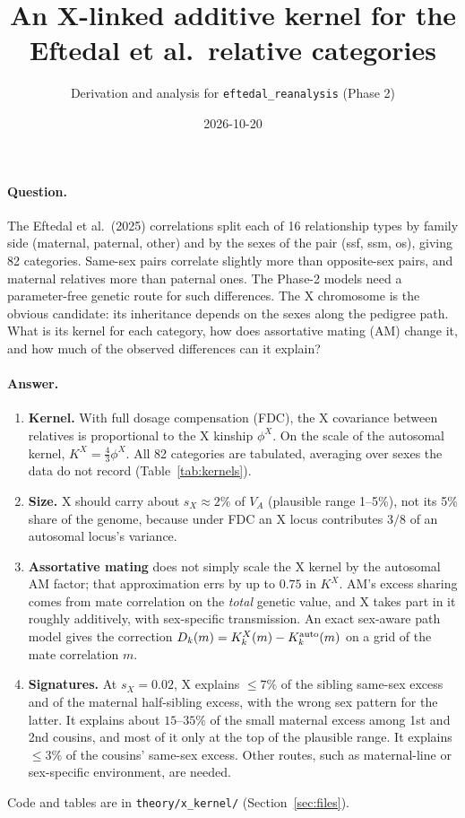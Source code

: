 \documentclass[11pt]{article}
\title{An X-linked additive kernel for the Eftedal et al.\ relative categories}
\author{Derivation and analysis for \texttt{eftedal\_reanalysis} (Phase 2)}
\date{2026-10-20}
\newcommand{\Kx}{K^{X}}
\newcommand{\Ka}{K^{\rm auto}}
\begin{document}
\maketitle

\paragraph{Question.}
The Eftedal et al.\ (2025) correlations split each of 16 relationship types by family side (maternal,
paternal, other) and by the sexes of the pair (ssf, ssm, os), giving 82 categories. Same-sex pairs correlate
slightly more than opposite-sex pairs, and maternal relatives more than paternal ones. The Phase-2 models
need a parameter-free genetic route for such differences. The X chromosome is the obvious candidate: its
inheritance depends on the sexes along the pedigree path. What is its kernel for each category, how does
assortative mating (AM) change it, and how much of the observed differences can it explain?

\paragraph{Answer.}
\begin{enumerate}
  \item \textbf{Kernel.} With full dosage compensation (FDC), the X covariance between relatives is
    proportional to the X kinship $\phi^X$. On the scale of the autosomal kernel, $\Kx=\tfrac43\phi^X$.
    All 82 categories are tabulated, averaging over sexes the data do not record (Table~\ref{tab:kernels}).
  \item \textbf{Size.} X should carry about $s_X\approx2\%$ of $V_A$ (plausible range 1--5\%), not its 5\%
    share of the genome, because under FDC an X locus contributes $3/8$ of an autosomal locus's variance.
  \item \textbf{Assortative mating} does not simply scale the X kernel by the autosomal AM factor; that
    approximation errs by up to $0.75$ in $\Kx$. AM's excess sharing comes from mate correlation on the
    \emph{total} genetic value, and X takes part in it roughly additively, with sex-specific transmission. An
    exact sex-aware path model gives the correction $D_k(m)=\Kx_k(m)-\Ka_k(m)$ on a grid of the mate correlation
    $m$.
  \item \textbf{Signatures.} At $s_X=0.02$, X explains $\le7\%$ of the sibling same-sex excess and of the
    maternal half-sibling excess, with the wrong sex pattern for the latter. It explains about $15$--$35\%$ of
    the small maternal excess among 1st and 2nd cousins, and most of it only at the top of the plausible range.
    It explains $\le3\%$ of the cousins' same-sex excess. Other routes, such as maternal-line or
    sex-specific environment, are needed.
\end{enumerate}
Code and tables are in \texttt{theory/x\_kernel/} (Section~\ref{sec:files}).
\end{document}
